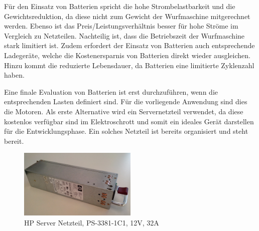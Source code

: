 Für den Einsatz von Batterien spricht die hohe Strombelastbarkeit und die
Gewichtsreduktion, da diese nicht zum Gewicht der Wurfmaschine mitgerechnet
werden. Ebenso ist das Preis/Leistungsverhältnis besser für
hohe Ströme im Vergleich zu Netzteilen. Nachteilig ist, dass die Betriebszeit
der Wurfmaschine stark limitiert ist. Zudem erfordert der Einsatz von
Batterien auch entsprechende Ladegeräte, welche die Kostenersparnis von
Batterien direkt wieder ausgleichen. Hinzu kommt die reduzierte Lebensdauer,
da Batterien eine limitierte Zyklenzahl haben. 

Eine finale Evaluation von Batterien ist erst durchzuführen, wenn die
entsprechenden Lasten definiert sind. Für die vorliegende Anwendung sind
dies die Motoren. Als erste Alternative wird ein Servernetzteil verwendet,
da diese kostenlos verfügbar sind im Elektroschrott und somit ein
ideales Gerät darstellen für die Entwicklungsphase. Ein solches Netzteil ist bereits
organisiert und steht bereit.

\begin{figure}[h!]
	\centering
	\includegraphics[width=0.5\textwidth]{../../fig/netzteil.jpg}
	\caption{HP Server Netzteil, PS-3381-1C1, 12V, 32A}
	\label{fig:server-power}
\end{figure}
